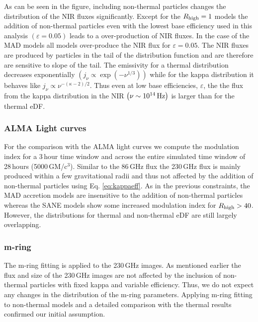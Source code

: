 As can be seen in the figure, including non-thermal particles changes the distribution of the NIR fluxes significantly. Except for the $R_{\rm high}=1$ models the addition of non-thermal particles even with the lowest base efficiency used in this analysis $\left( \varepsilon=0.05\right)$ leads to a over-production of NIR fluxes. In the case of the MAD models all models over-produce the NIR flux for $\varepsilon=0.05$.
\newline The NIR fluxes are produced by particles in the tail of the distribution function and are therefore are sensitive to slope of the tail. The emissivity for a thermal distribution decreases exponentially $\left(j_{\nu}\propto\exp(-\nu^{1/3})\right)$ while for the kappa distribution it behaves like $j_{\nu}\propto \nu^{-(\kappa-2)/2}$. Thus even at low base efficiencies, $\varepsilon$, the the flux from the kappa distribution in the NIR $\left(\nu\sim 10^{14}\,\rm{Hz}\right)$ is larger than for the thermal eDF.

\subsubsection{ALMA Light curves}
For the comparison with the ALMA light curves we compute the modulation index for a 3\,hour time window and across the entire simulated time window of 28\,hours (5000\,GM/c$^3$). Similar to the 86\,GHz flux the 230\,GHz flux is mainly produced within a few gravitational radii and thus not affected by the addition of non-thermal particles using Eq. \ref{eq:kappaeff}. As in the previous constraints, the MAD accretion models are insensitive to the addition of non-thermal particles whereas the SANE models show some increased modulation index for $R_{\rm high}>40$. However, the distributions for thermal and non-thermal eDF are still largely overlapping.

\subsubsection{m-ring}
The m-ring fitting is applied to the 230\,GHz images. As mentioned earlier the flux and size of the 230\,GHz images are not affected by the inclusion of non-thermal particles with fixed kappa and variable efficiency. Thus, we do not expect any changes in the distribution of the m-ring parameters.  Applying m-ring fitting to non-thermal models and a detailed comparison with the thermal results confirmed our initial assumption. 

